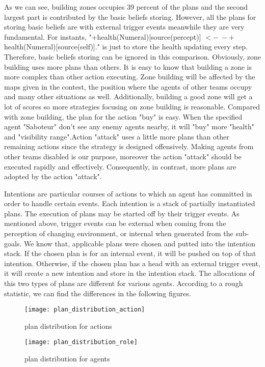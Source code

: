 \documentclass{llncs}
\begin{document}
As we can see, building zones occupies 39 percent of the plans and the second largest part is contributed by the basic beliefs storing. However, all the plans for storing basic beliefs are with external trigger events meanwhile they are very fundamental. For instants, "+health(Numeral)[source(percept)] $<- \ -+$health(Numeral)[source(self)]." is just to store the health updating every step. Therefore, basic beliefs storing can be ignored in this comparison. Obviously, zone building uses more plans than others. It is easy to know that building a zone is more complex than other action executing. Zone building will be affected by the maps given in the contest, the position where the agents of other teams occupy and many other situations as well. Additionally, building a good zone will get a lot of scores so more strategies focusing on zone building is reasonable. Compared with zone building, the plan for the action "buy" is easy. When the specified agent "Saboteur" don't see any enemy agents nearby, it will "buy" more "health" and "visibility range".Action "attack" uses a little more plans than other remaining actions since the strategy is designed offensively. Making agents from other teams disabled is our purpose, moreover the action "attack" should be executed rapidly and effectively. Consequently, in contrast, more plans are adopted by the action "attack".

Intentions are particular courses of actions to which an agent has committed in order to handle certain events. Each intention is a stack of partially instantiated plans\cite{rafael_Javabased_2007}. The execution of plans may be started off by their trigger events. As mentioned above, trigger events can be external when coming from the perception of changing environment, or internal when generated from the sub-goals. We know that, applicable plans were chosen and putted into the intention stack. If the chosen plan is for an internal event, it will be pushed on top of that intention. Otherwise, if the chosen plan has a head with an external trigger event, it will create a new intention and store in the intention stack. The allocations of this two types of plans are different for various agents. According to a rough statistic, we can find the differences in the following figures.
\begin{figure}
\centering
\begin{minipage}[!htbp]{\linewidth}
\texttt{[image: plan\_distribution\_action]}
\caption{plan distribution for actions}
\label{fig:plan_allocation}
\end{minipage}
\end{figure}
\begin{figure}
\centering
\begin{minipage}[!htbp]{\linewidth}
\texttt{[image: plan\_distribution\_role]}
\caption{plan distribution for agents}
\label{fig:baselinex}
\end{minipage}
\end{figure}
 
\end{document}
